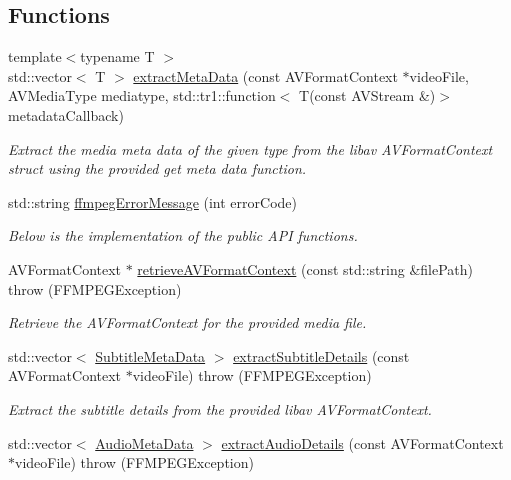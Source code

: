 \subsection*{Functions}
\begin{DoxyCompactItemize}
\item 
{\footnotesize template$<$typename T $>$ }\\std::vector$<$ T $>$ \hyperlink{namespacetranscode_1_1util_afaf550997dea9058e5331e14100dcecc}{extractMetaData} (const AVFormatContext $\ast$videoFile, AVMediaType mediatype, std::tr1::function$<$ T(const AVStream \&)$>$ metadataCallback)
\begin{DoxyCompactList}\small\item\em Extract the media meta data of the given type from the libav AVFormatContext struct using the provided get meta data function. \item\end{DoxyCompactList}\item 
std::string \hyperlink{namespacetranscode_1_1util_ac43b28725fca57894665f5775b42111a}{ffmpegErrorMessage} (int errorCode)
\begin{DoxyCompactList}\small\item\em Below is the implementation of the public API functions. \item\end{DoxyCompactList}\item 
AVFormatContext $\ast$ \hyperlink{namespacetranscode_1_1util_a65511e44b87092eba02246dd0a6fe103}{retrieveAVFormatContext} (const std::string \&filePath)  throw (FFMPEGException)
\begin{DoxyCompactList}\small\item\em Retrieve the AVFormatContext for the provided media file. \item\end{DoxyCompactList}\item 
std::vector$<$ \hyperlink{structtranscode_1_1SubtitleMetaData}{SubtitleMetaData} $>$ \hyperlink{namespacetranscode_1_1util_a5d54bc962ed8a3ce2d592355e476bcdd}{extractSubtitleDetails} (const AVFormatContext $\ast$videoFile)  throw (FFMPEGException)
\begin{DoxyCompactList}\small\item\em Extract the subtitle details from the provided libav AVFormatContext. \item\end{DoxyCompactList}\item 
std::vector$<$ \hyperlink{structtranscode_1_1AudioMetaData}{AudioMetaData} $>$ \hyperlink{namespacetranscode_1_1util_a77ca59f993d80e7f19ea20fdc6143222}{extractAudioDetails} (const AVFormatContext $\ast$videoFile)  throw (FFMPEGException)

\end{DoxyCompactItemize}
